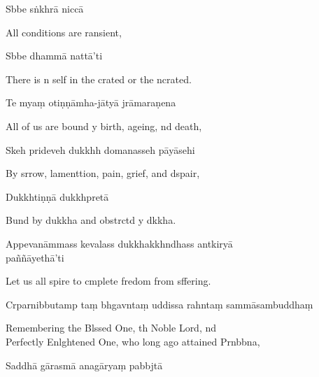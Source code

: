 Sbbe sṅkhrā niccā

\begin{english}
  All conditions are ransient,
\end{english}

Sbbe dhammā nattā'ti

\begin{english}
  There is n self in the crated or the ncrated.
\end{english}

Te myaṃ otiṇṇāmha-jātyā jrāmaraṇena

\begin{english}
  All of us are bound y birth, ageing, nd death,
\end{english}

Skeh prideveh dukkhh domanasseh pāyāsehi

\begin{english}
  By srrow, lamenttion, pain, grief, and dspair,
\end{english}

Dukkhtiṇṇā dukkhpretā

\begin{english}
  Bund by dukkha and obstrctd y dkkha.
\end{english}

Appevanāmmass kevalass dukkhakkhndhass antkiryā \\paññāyethā'ti

\begin{english}
  Let us all spire to cmplete fredom from sffering.
\end{english}


Crparnibbutamp taṃ bhgavntaṃ uddissa rahntaṃ sammāsambuddhaṃ

\begin{english}
  Remembering the Blssed One, th Noble Lord, nd \\Perfectly Enlghtened One, who long ago attained Prnbbna,
\end{english}

Saddhā gārasmā anagāryaṃ pabbjtā

